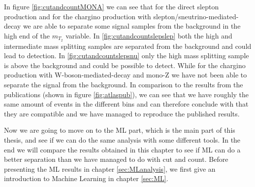 In figure \ref{fig:cutandcountMONA} we can see that for the direct slepton production and for the chargino production with slepton/sneutrino-mediated-decay we are able to separate some signal samples from the background in the high end of the $m_{T_2}$ variable. In \ref{fig:cutandcountslepslep} both the high and intermediate mass splitting samples are separated from the background and could lead to detection. In \ref{fig:cutandcountslepsnu} only the high mass splitting sample is above the background and could be possible to detect. While for the chargino production with W-boson-mediated-decay and mono-Z we have not been able to separate the signal from the background. In comparison to the results from the publications (shown in figure \ref{fig:atlaspub}), we can see that we have roughly the same amount of events in the different bins and can therefore conclude with that they are compatible and we have managed to reproduce the published results.

Now we are going to move on to the ML part, which is the main part of this thesis, and see if we can do the same analysis with some different tools. In the end we will compare the results obtained in this chapter to see if ML can do a better separation than we have managed to do with cut and count. Before presenting the ML results in chapter \ref{sec:MLanalysis}, we first give an introduction to Machine Learning in chapter \ref{sec:ML}.


























